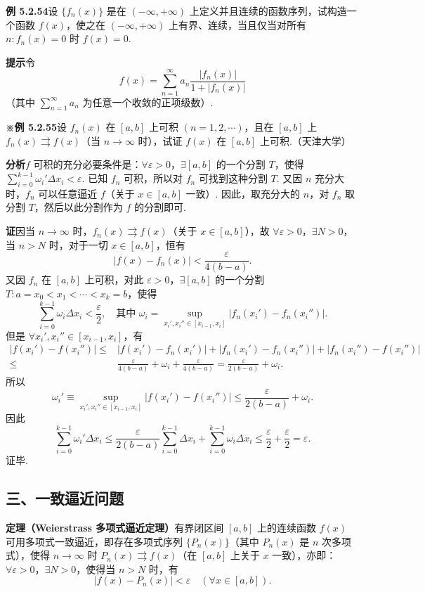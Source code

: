 \documentclass[UTF8, 12pt, fontset=fandol, oneside]{ctexart}
\begin{document}
\noindent\textbf{例 5.2.54}\quad 设 $\{f_n(x)\}$ 是在 $(-\infty,+\infty)$ 上定义并且连续的函数序列，试构造一个函数
$f(x)$，使之在 $(-\infty,+\infty)$ 上有界、连续，当且仅当对所有 $n:f_n(x)=0$ 时
$f(x)=0$.

\noindent\textbf{提示}\quad 令
\[
  f(x)=\sum_{n=1}^{\infty}a_n\frac{|f_n(x)|}{1+|f_n(x)|}
\]
（其中 $\displaystyle\sum_{n=1}^{\infty}a_n$ 为任意一个收敛的正项级数）.

\noindent\textbf{※例 5.2.55}\quad 设 $f_n(x)$ 在 $[a,b]$ 上可积 $(n=1,2,\cdots)$，且在 $[a,b]$ 上
$f_n(x)\rightrightarrows f(x)$（当 $n\to\infty$ 时），试证 $f(x)$ 在 $[a,b]$ 上可积.（天津大学）

\noindent\textbf{分析}\quad $f$ 可积的充分必要条件是：$\forall\varepsilon>0$，$\exists [a,b]$ 的一个分割 $T$，使得
$\displaystyle\sum_{i=0}^{k-1}\omega_i'\Delta x_i<\varepsilon$. 已知 $f_n$ 可积，所以对 $f_n$ 可找到这种分割 $T$.
又因 $n$ 充分大时，$f_n$ 可以任意逼近 $f$（关于 $x\in[a,b]$ 一致）. 因此，取充分大的 $n$，对 $f_n$ 取分割
$T$，然后以此分割作为 $f$ 的分割即可.

\noindent\textbf{证}\quad 因当 $n\to\infty$ 时，$f_n(x)\rightrightarrows f(x)$（关于 $x\in[a,b]$），故
$\forall\varepsilon>0$，$\exists N>0$，当 $n>N$ 时，对于一切 $x\in[a,b]$，恒有
\[
  |f(x)-f_n(x)|<\frac{\varepsilon}{4(b-a)}.
\]
又因 $f_n$ 在 $[a,b]$ 上可积，对此 $\varepsilon>0$，$\exists [a,b]$ 的一个分割
$T:a=x_0<x_1<\cdots<x_k=b$，使得
\[
  \sum_{i=0}^{k-1}\omega_i\Delta x_i<\frac\varepsilon2,\quad
  \text{其中 }\omega_i=\sup_{x_i',x_i''\in[x_{i-1},x_i]}|f_n(x_i')-f_n(x_i'')|.
\]
但是 $\forall x_i',x_i''\in[x_{i-1},x_i]$，有
\[
\begin{aligned}
|f(x_i')-f(x_i'')|
\le{}& |f(x_i')-f_n(x_i')|+|f_n(x_i')-f_n(x_i'')|
+|f_n(x_i'')-f(x_i'')|\\
\le{}&\frac{\varepsilon}{4(b-a)}+\omega_i+\frac{\varepsilon}{4(b-a)}
=\frac{\varepsilon}{2(b-a)}+\omega_i.
\end{aligned}
\]
所以
\[
  \omega_i'\equiv\sup_{x_i',x_i''\in[x_{i-1},x_i]}|f(x_i')-f(x_i'')|
  \le\frac{\varepsilon}{2(b-a)}+\omega_i.
\]
因此
\[
  \sum_{i=0}^{k-1}\omega_i'\Delta x_i
  \le\frac{\varepsilon}{2(b-a)}\sum_{i=0}^{k-1}\Delta x_i
  +\sum_{i=0}^{k-1}\omega_i\Delta x_i
  \le\frac\varepsilon2+\frac\varepsilon2=\varepsilon.
\]
证毕.

\subsection*{三、一致逼近问题}

\noindent\textbf{定理（Weierstrass 多项式逼近定理）}\quad 有界闭区间 $[a,b]$ 上的连续函数 $f(x)$ 可用多项式一致逼近，即存在多项式序列
$\{P_n(x)\}$（其中 $P_n(x)$ 是 $n$ 次多项式），使得 $n\to\infty$ 时
$P_n(x)\rightrightarrows f(x)$（在 $[a,b]$ 上关于 $x$ 一致），亦即：
$\forall\varepsilon>0$，$\exists N>0$，使得当 $n>N$ 时，有
\[
  |f(x)-P_n(x)|<\varepsilon\quad(\forall x\in[a,b]).
\]
\end{document}
